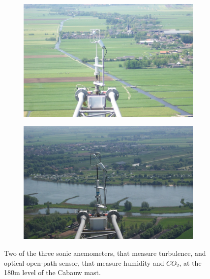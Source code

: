 \documentclass[a4paper]{book}
\begin{document}
\begin{figure}
    \centering
    \begin{subfigure}[t]{0.48\textwidth}
        \centering
		\includegraphics[width=\textwidth]{images/cabauw_turbulence_instruments}
    \end{subfigure}
    \hfill
    \begin{subfigure}[t]{0.48\textwidth}
        \centering
		\includegraphics[width=\textwidth]{images/cabauw_turbulence_instruments_2}
    \end{subfigure}
\caption{Two of the three sonic anemometers, that measure turbulence, and optical open-path sensor, that measure humidity and $CO_2$, at the 180m level of the Cabauw mast.}
\label{fig:cabauw_180m_instruments}
\end{figure}
\end{document}
